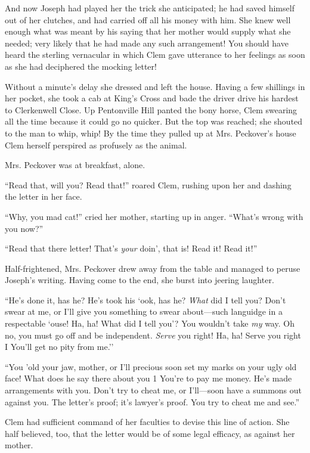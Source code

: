 And now Joseph had played her the trick she anticipated; he had saved
himself out of her clutches, and had carried off all his money with him.
She knew well enough what was meant by his saying that her mother would
supply what she needed; very likely that he had made any such
arrangement! You should have heard the sterling vernacular in which Clem
gave utterance to her feelings as soon as she had deciphered the mocking
letter!

Without a minute's delay she dressed and left the house. Having a few
shillings in her pocket, she took a cab at King's Cross and bade the
driver drive his hardest to Clerkenwell Close. Up Pentonville Hill
panted the bony horse, Clem swearing all the time because it could go no
quicker. But the top was reached; she shouted to the man to whip, whip!
By the time they pulled up at Mrs. Peckover's house Clem herself
perspired as profusely as the animal.

Mrs. Peckover was at breakfast, alone.

``Read that, will you? Read that!'' roared
{\protect\hypertarget{242}{}{}}Clem, rushing upon her and dashing the
letter in her face.

``Why, you mad cat!'' cried her mother, starting up in anger. ``What's
wrong with you now?''

``Read that there letter! That's \emph{your} doin', that is! Read it!
Read it!''

Half-frightened, Mrs. Peckover drew away from the table and managed to
peruse Joseph's writing. Having come to the end, she burst into jeering
laughter.

``He's done it, has he? He's took his `ook, has he? \emph{What} did I
tell you? Don't swear at me, or I'll give you something to swear
about---such languidge in a respectable `ouse! Ha, ha! What did I tell
you'? You wouldn't take \emph{my} way. Oh no, you must go off and be
independent. \emph{Serve} you right! Ha, ha! Serve you right I You'll
get no pity from me.''

``You 'old your jaw, mother, or I'll precious soon set my marks on your
ugly old face! What does he say there about you 1 You're to pay me
money. He's made arrangements with you. Don't try to cheat me, or
I'll---soon have a summons out against you. The
{\protect\hypertarget{243}{}{}}letter's proof; it's lawyer's proof. You
try to cheat me and see.''

Clem had sufficient command of her faculties to devise this line of
action. She half believed, too, that the letter would be of some legal
efficacy, as against her mother.

